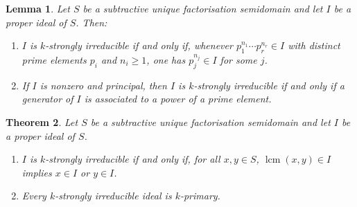 \documentclass[11pt,leqno]{amsart}
\newtheorem{theorem}{Theorem}[section]
\newtheorem{lemma}[theorem]{Lemma}
\theoremstyle{definition}
\numberwithin{equation}{section}
\begin{document}
\begin{lemma}\label{loc15}
    Let $S$ be a subtractive unique factorisation semidomain and let $I$ be a proper ideal of $S$. Then:
    \begin{enumerate}
        \item $I$ is $k$-strongly irreducible if and only if, whenever
        $p_1^{n_1}\cdots p_r^{n_r}\in I$ with distinct prime elements $p_i$ and $n_i\ge1$, one has $p_j^{n_j}\in I$ for some $j$.
        \item If $I$ is nonzero and principal, then $I$ is $k$-strongly irreducible if and only if a generator of $I$ is associated to a power of a prime element.
    \end{enumerate}
\end{lemma}





\begin{theorem}\label{loc2}
Let $S$ be a subtractive unique factorisation semidomain and let $I$ be a proper ideal of $S$.
\begin{enumerate}
\item $I$ is $k$-strongly irreducible if and only if, for all $x,y\in S$, $\operatorname{lcm}(x,y)\in I$ implies $x\in I$ or $y\in I$.
\item Every $k$-strongly irreducible ideal is $k$-primary.
\end{enumerate}
\end{theorem}
\end{document}
